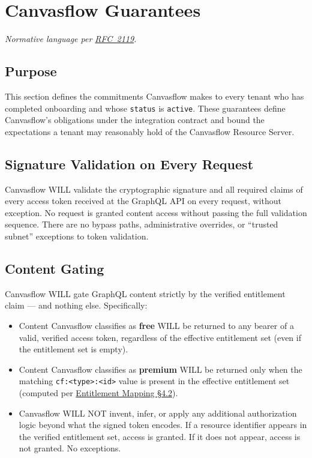 
\section{Canvasflow Guarantees}\label{sec:canvasflow-guarantees}

\textit{Normative language per \href{https://tools.ietf.org/html/rfc2119}{RFC~2119}.}

\subsection{Purpose}

This section defines the commitments Canvasflow makes to every tenant who has completed
onboarding and whose \texttt{status} is \texttt{active}. These guarantees define
Canvasflow's obligations under the integration contract and bound the expectations a
tenant may reasonably hold of the Canvasflow Resource Server.

\subsection{Signature Validation on Every Request}

Canvasflow WILL validate the cryptographic signature and all required claims of every
access token received at the GraphQL API on every request, without exception. No request
is granted content access without passing the full validation sequence.
 There are no bypass paths, administrative overrides, or ``trusted subnet'' 
 exceptions to token validation.

\subsection{Content Gating}

Canvasflow WILL gate GraphQL content strictly by the verified entitlement claim --- and
nothing else. Specifically:



\begin{itemize}
  \item Content Canvasflow classifies as \textbf{free} WILL be returned to any bearer of
    a valid, verified access token, regardless of the effective entitlement set (even if
    the entitlement set is empty).

  \item Content Canvasflow classifies as \textbf{premium} WILL be returned only when the
    matching \texttt{cf:<type>:<id>} value is present in the effective entitlement set
    (computed per \hyperref[sec:mandatory-value-format]{Entitlement Mapping \S4.2}).

  \item Canvasflow WILL NOT invent, infer, or apply any additional authorization logic
    beyond what the signed token encodes. If a resource identifier appears in the
    verified entitlement set, access is granted. If it does not appear, access is not
    granted. No exceptions.
\end{itemize}

